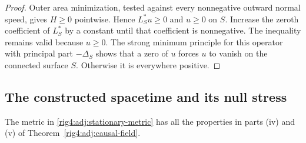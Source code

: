 \begin{proof}
Outer area minimization, tested against every nonnegative outward normal
speed, gives $H\ge0$ pointwise.  Hence $L_S^*u\ge0$ and $u\ge0$ on $S$.
Increase the zeroth coefficient of $L_S^*$ by a constant until that
coefficient is nonnegative.  The inequality remains valid because $u\ge0$.
The strong minimum principle for this operator with principal part
$-\Delta_S$ shows that a zero of $u$ forces $u$ to vanish on the connected
surface $S$.  Otherwise it is everywhere positive.
\end{proof}

\subsection{The constructed spacetime and its null stress}

\begin{lemma}
\label{rig4:adj:killing-development}
The metric in \eqref{rig4:adj:stationary-metric} has all the properties in
parts \textup{(iv)} and \textup{(v)} of Theorem~\ref{rig4:adj:causal-field}.
\end{lemma}

